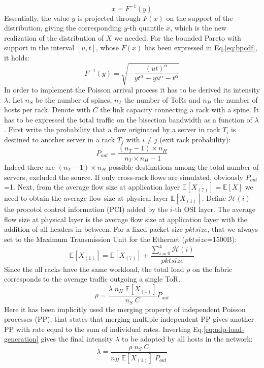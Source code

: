 \[
x = F^{-1}(y)
\]
Essentially, the value $y$ is projected through $F(x)$ on the support of the distribution, giving the corresponding $y$-th quantile $x$, which is the new realization of the distribution of $X$ we needed. For the bounded Pareto with support in the interval $[u,t]$, whose $F(x)$ has been expressed in Eq.\ref{eq:bpcdf}, it holds:
\[
F^{-1}(y) = \sqrt{-\dfrac{(ut)^\alpha}{yt^\alpha - yu^\alpha - t^\alpha}}
\]
In order to implement the Poisson arrival process it has to be derived its intensity $\lambda$. Let $n_S$ be the number of spines, $n_T$ the number of ToRs and $n_H$ the number of hosts per rack. Denote with $C$ the link capacity connecting a rack with a spine. It has to be expressed the total traffic on the bisection bandwidth as a function of $\lambda$. First write the probability that a flow originated by a server in rack $T_i$ is destined to another server in a rack $T_j$ with $i \neq j$ (exit rack probability):
\[
P_{out} = \frac{(n_T-1)\times n_H}{n_T \times n_H - 1}
\]
Indeed there are $(n_T-1)\times n_H$ possible destinations among the total number of servers, excluded the source. If only cross-rack flows are simulated, obviously $P_{out}$=1.  Next, from the average flow size at application layer $\mathbb{E}[X_{(7)}]=\mathbb{E}[X]$ we need to obtain the average flow size at physical layer $\mathbb{E}[X_{(1)}]$. Define $\mathcal{H}(i)$ the procotol control information (PCI) added by the $i$-th OSI layer. The average flow size at physical layer is the average flow size at application layer with the addition of all headers in between. For a fixed packet size $pktsize$, that we always set to the Maximum Transmission Unit for the Ethernet ($pktsize$=1500B):
\[
\mathbb{E}[X_{(1)}] = \mathbb{E}[X_{(7)}] + \dfrac{\sum_{i=0}^{4}\mathcal{H}(i)}{pktsize}
\]
Since the all racks have the same workload, the total load $\rho$ on the fabric corresponds to the average traffic outgoing a single ToR.
\begin{equation}
	\label{eq:udp-load-generation}
	\rho = \dfrac{\lambda \; n_H \; \mathbb{E}[X_{(1)}]}{n_S \; C} P_{out}
\end{equation} 
Here it has been implicitly used the merging property of independent Poisson processes (PP), that states that merging multiple independent PP gives another PP with rate equal to the sum of individual rates. Inverting Eq.\eqref{eq:udp-load-generation} gives the final intensity $\lambda$ to be adopted by all hosts in the network: 
\begin{equation}
	\label{eq:lambda}
	\lambda = \frac{\rho \; n_S \; C}{n_H \; \mathbb{E}[X_{(1)}] \; P_{out}}
\end{equation}
